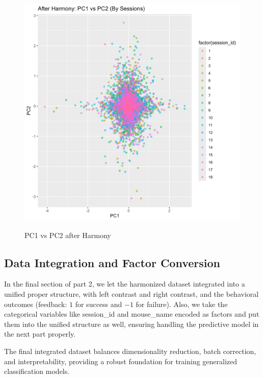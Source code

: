 \documentclass{article}
\begin{document}
\begin{figure}[htbp]
\begin{minipage}[t]{0.48\textwidth}
			\includegraphics[scale=0.4]{Pics/16}\label{fig:1.16}
			\caption{PC1 vs PC2 after Harmony}
		\end{minipage}
	\end{figure}
	\subsection{Data Integration and Factor Conversion}
	\par In the final section of part 2, we let the harmonized dataset integrated into a unified proper structure, with  left contrast and right contrast, and the behavioral outcomes (feedback: $1$ for success and $-1$ for failure). Also, we take the categorical variables like session\_id and mouse\_name encoded as factors and put them into the unified structure as well, ensuring handling the predictive model in the next part properly.
	\par The final integrated dataset balances dimensionality reduction, batch correction, and interpretability, providing a robust foundation for training generalized classification models.
	\clearpage
\end{document}
